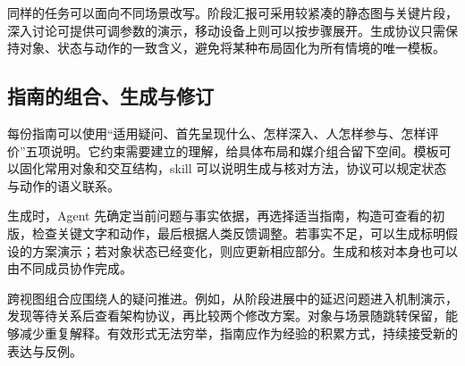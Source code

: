 同样的任务可以面向不同场景改写。阶段汇报可采用较紧凑的静态图与关键片段，深入讨论可提供可调参数的演示，移动设备上则可以按步骤展开。生成协议只需保持对象、状态与动作的一致含义，避免将某种布局固化为所有情境的唯一模板。

\subsection{指南的组合、生成与修订}
每份指南可以使用“适用疑问、首先呈现什么、怎样深入、人怎样参与、怎样评价”五项说明。它约束需要建立的理解，给具体布局和媒介组合留下空间。模板可以固化常用对象和交互结构，skill 可以说明生成与核对方法，协议可以规定状态与动作的语义联系。

生成时，Agent 先确定当前问题与事实依据，再选择适当指南，构造可查看的初版，检查关键文字和动作，最后根据人类反馈调整。若事实不足，可以生成标明假设的方案演示；若对象状态已经变化，则应更新相应部分。生成和核对本身也可以由不同成员协作完成。

跨视图组合应围绕人的疑问推进。例如，从阶段进展中的延迟问题进入机制演示，发现等待关系后查看架构协议，再比较两个修改方案。对象与场景随跳转保留，能够减少重复解释。有效形式无法穷举，指南应作为经验的积累方式，持续接受新的表达与反例。
